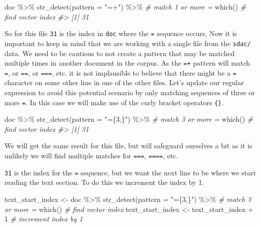 \documentclass[
]{article}
\newenvironment{Shaded}{\begin{snugshade}}{\end{snugshade}}
\newcommand{\AttributeTok}[1]{\textcolor[rgb]{0.77,0.63,0.00}{#1}}
\newcommand{\CommentTok}[1]{\textcolor[rgb]{0.56,0.35,0.01}{\textit{#1}}}
\newcommand{\DecValTok}[1]{\textcolor[rgb]{0.00,0.00,0.81}{#1}}
\newcommand{\FunctionTok}[1]{\textcolor[rgb]{0.00,0.00,0.00}{#1}}
\newcommand{\NormalTok}[1]{#1}
\newcommand{\OtherTok}[1]{\textcolor[rgb]{0.56,0.35,0.01}{#1}}
\newcommand{\SpecialCharTok}[1]{\textcolor[rgb]{0.00,0.00,0.00}{#1}}
\newcommand{\StringTok}[1]{\textcolor[rgb]{0.31,0.60,0.02}{#1}}
\begin{document}
\begin{Shaded}
\begin{Highlighting}[]
\NormalTok{doc }\SpecialCharTok{\%\textgreater{}\%} 
  \FunctionTok{str\_detect}\NormalTok{(}\AttributeTok{pattern =} \StringTok{"=+"}\NormalTok{) }\SpecialCharTok{\%\textgreater{}\%} \CommentTok{\# match 1 or more \textasciigrave{}=\textasciigrave{}}
  \FunctionTok{which}\NormalTok{() }\CommentTok{\# find vector index}
\CommentTok{\#\textgreater{} [1] 31}
\end{Highlighting}
\end{Shaded}

So for this file \texttt{31} is the index in \texttt{doc} where the \texttt{=} sequence occurs. Now it is important to keep in mind that we are working with a single file from the \texttt{sdac/} data. We need to be cautious to not create a pattern that may be matched multiple times in another document in the corpus. As the \texttt{=+} pattern will match \texttt{=}, or \texttt{==}, or \texttt{===}, etc. it is not implausible to believe that there might be a \texttt{=} character on some other line in one of the other files. Let's update our regular expression to avoid this potential scenario by only matching sequences of three or more \texttt{=}. In this case we will make use of the curly bracket operators \texttt{\{\}}.

\begin{Shaded}
\begin{Highlighting}[]
\NormalTok{doc }\SpecialCharTok{\%\textgreater{}\%} 
  \FunctionTok{str\_detect}\NormalTok{(}\AttributeTok{pattern =} \StringTok{"=\{3,\}"}\NormalTok{) }\SpecialCharTok{\%\textgreater{}\%} \CommentTok{\# match 3 or more \textasciigrave{}=\textasciigrave{}}
  \FunctionTok{which}\NormalTok{() }\CommentTok{\# find vector index}
\CommentTok{\#\textgreater{} [1] 31}
\end{Highlighting}
\end{Shaded}

We will get the same result for this file, but will safeguard ourselves a bit as it is unlikely we will find multiple matches for \texttt{===}, \texttt{====}, etc.

\texttt{31} is the index for the \texttt{=} sequence, but we want the next line to be where we start reading the text section. To do this we increment the index by 1.

\begin{Shaded}
\begin{Highlighting}[]
\NormalTok{text\_start\_index }\OtherTok{\textless{}{-}} 
\NormalTok{  doc }\SpecialCharTok{\%\textgreater{}\%} 
  \FunctionTok{str\_detect}\NormalTok{(}\AttributeTok{pattern =} \StringTok{"=\{3,\}"}\NormalTok{) }\SpecialCharTok{\%\textgreater{}\%} \CommentTok{\# match 3 or more \textasciigrave{}=\textasciigrave{} }
  \FunctionTok{which}\NormalTok{() }\CommentTok{\# find vector index}
\NormalTok{text\_start\_index }\OtherTok{\textless{}{-}}\NormalTok{ text\_start\_index }\SpecialCharTok{+} \DecValTok{1} \CommentTok{\# increment index by 1}
\end{Highlighting}
\end{Shaded}
\end{document}

